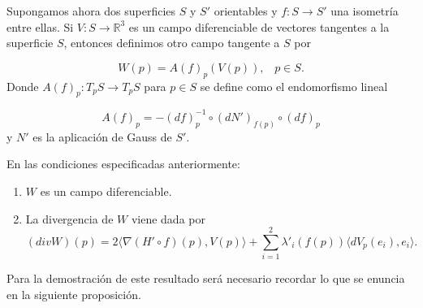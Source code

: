 Supongamos ahora dos superficies $S$ y $S'$ orientables  y $f : S \to S'$ una isometría entre ellas. Si $V : S \to \mathbb{R}^3$ es un campo diferenciable de vectores tangentes a la superficie $S$, entonces definimos otro campo tangente a $S$ por

	\[
		W(p) = A(f)_p(V(p)), \;\;\; p \in S.
	\]
Donde $A(f)_p : T_p S \to T_p S$ para $p \in S$ se define como el endomorfismo lineal

	\[
		A(f)_p = -(df)^{-1}_{p} \circ (dN')_{f(p)} \circ (df)_p
	\]
y $N'$ es la aplicación de Gauss de $S'$.

\begin{lema} \label{lem:lema1}
	En las condiciones especificadas anteriormente:
	\begin{enumerate}
		\item $W$ es un campo diferenciable.
		\item La divergencia de $W$ viene dada por 
		\[
			(div W)(p) = 2 \langle \nabla (H' \circ f)(p), V(p) \rangle + \sum_{i=1}^{2} \lambda'_{i}(f(p)) \langle dV_p(e_i), e_i \rangle.
		\]
	\end{enumerate}
	
\end{lema}


	${ }$\\
	
	Para la demostración de este resultado será necesario recordar lo que se enuncia en la siguiente proposición.
	${ }$\\
	
